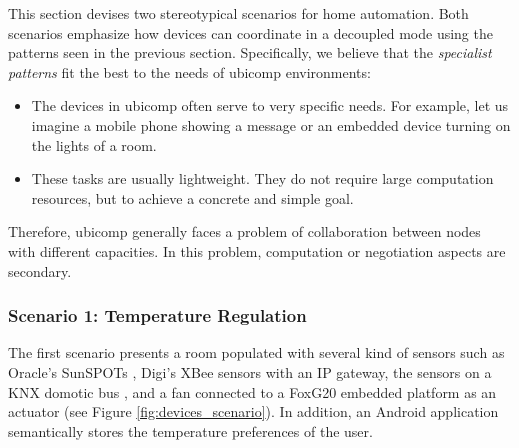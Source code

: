 This section devises two stereotypical scenarios for home automation.
Both scenarios emphasize how devices can coordinate in a decoupled mode using the patterns seen in the previous section. %
Specifically, we believe that the \emph{specialist patterns} fit the best to the needs of \ac{ubicomp} environments:
\begin{itemize}
  \item The devices in \ac{ubicomp} often serve to very specific needs. %
        For example, let us imagine a mobile phone showing a message or an embedded device turning on the lights of a room. %
  \item These tasks are usually lightweight. %
        They do not require large computation resources, but to achieve a concrete and simple goal. %
\end{itemize}
Therefore, \ac{ubicomp} generally faces a problem of collaboration between nodes with different capacities.
In this problem, computation or negotiation aspects are secondary. %



\subsubsection{Scenario 1: Temperature Regulation}

The first scenario presents a room populated with several kind of sensors such as Oracle's SunSPOTs ,
Digi's XBee sensors with an IP gateway,
the sensors on a KNX domotic bus , and a fan connected to a FoxG20  embedded platform as an actuator (see Figure \ref{fig:devices_scenario}).
In addition, an Android application  semantically stores the temperature preferences of the user.



